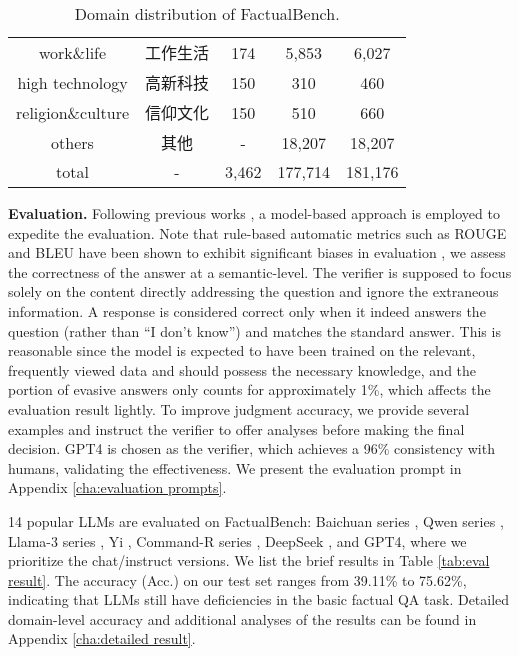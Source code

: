 \begin{CJK*}{UTF8}{gbsn}
\begin{table}[!htb]
{\begin{tabular}{ccccc}
    work\&life                      & 工作生活  &    174       &   5,853       &  6,027     \\
    high technology                  & 高新科技  &    150       &   310       &  460     \\
    religion\&culture           & 信仰文化  &     150      &   510       &  660     \\
    others                   & 其他    &    -       &   18,207       &  18,207     \\ 
    \midrule
    total                     & -     &   3,462        &   177,714       &   181,176   \\
    \bottomrule[1.5pt]
    \end{tabular}%
    }
  \caption{Domain distribution of FactualBench.}
  \label{tab:construction}
\end{table}
\end{CJK*}

\textbf{Evaluation.} Following previous works \citep{liu2023alignbench, zheng2023judging}, a model-based approach is employed to expedite the evaluation. Note that rule-based automatic metrics such as ROUGE \citep{lin2004rouge} and BLEU \citep{papineni2002bleu} have been shown to exhibit significant biases in evaluation \citep{lou2024large}, we assess the correctness of the answer at a semantic-level. The verifier is supposed to focus solely on the content directly addressing the question and ignore the extraneous information. A response is considered correct only when it indeed answers the question (rather than ``I don't know'') and matches the standard answer. This is reasonable since the model is expected to have been trained on the relevant, frequently viewed data and should possess the necessary knowledge, and the portion of evasive answers only counts for approximately 1\%, which affects the evaluation result lightly. To improve judgment accuracy, we provide several examples and instruct the verifier to offer analyses before making the final decision. GPT4 is chosen as the verifier, which achieves a 96\% consistency with humans, validating the effectiveness. We present the evaluation prompt in Appendix \ref{cha:evaluation prompts}.

14 popular LLMs are evaluated on FactualBench: Baichuan series \citep{yang2023baichuan}, Qwen series \citep{qwen, qwen2}, Llama-3 series \citep{llama3modelcard}, Yi \citep{ai2024yi}, Command-R series \citep{CommandR, CommandR+}, DeepSeek \citep{deepseekv2}, and GPT4, where we prioritize the chat/instruct versions. We list the brief results in Table \ref{tab:eval result}. The accuracy (Acc.) on our test set ranges from 39.11\% to 75.62\%, indicating that LLMs still have deficiencies in the basic factual QA task. Detailed domain-level accuracy and additional analyses of the results can be found in Appendix \ref{cha:detailed result}. 

